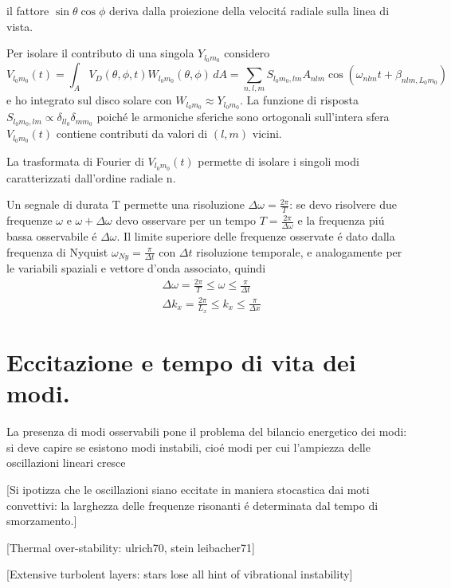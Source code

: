 \documentclass[../main.tex]{subfiles}
\begin{document}
il fattore $\sin{\theta}\cos{\phi}$ deriva dalla proiezione della velocit\'a radiale sulla linea di vista.

Per isolare il contributo di una singola $Y_{l_0m_0}$ considero
\begin{equation}
V_{l_0m_0}(t)=\int_AV_D(\theta,\phi,t)W_{l_0m_0}(\theta,\phi)\,dA=\sum_{n,l,m}S_{l_0m_0,lm}A_{nlm}\cos{(\omega_{nlm}t+\beta_{nlm,L_0m_0})}
\end{equation}
e ho integrato sul disco solare con $W_{l_0m_0}\approx Y_{l_0m_0}$. La funzione di risposta $S_{l_0m_0,lm}\propto\delta_{ll_0}\delta_{mm_0}$ poich\'e le armoniche sferiche sono ortogonali sull'intera sfera $V_{l_0m_0}(t)$ contiene contributi da valori di $(l,m)$ vicini.

La trasformata di Fourier di $V_{l_0m_0}(t)$ permette di isolare i singoli modi caratterizzati dall'ordine radiale n.

Un segnale di durata T permette una risoluzione $\Delta\omega=\frac{2\pi}{T}$: se devo risolvere due frequenze $\omega$ e $\omega+\Delta\omega$ devo osservare per un tempo $T=\frac{2\pi}{\Delta\omega}$ e la frequenza pi\'u bassa osservabile \'e $\Delta\omega$. Il limite superiore delle frequenze osservate \'e dato dalla frequenza di Nyquist $\omega_{Ny}=\frac{\pi}{\Delta t}$ con $\Delta t$ risoluzione temporale, e analogamente per le variabili spaziali e vettore d'onda associato, quindi
\begin{align}
&\Delta\omega=\frac{2\pi}{T}\leq\omega\leq\frac{\pi}{\Delta t}\\
&\Delta k_x=\frac{2\pi}{L_x}\leq k_x\leq\frac{\pi}{\Delta x}
\end{align}


\section{Eccitazione e tempo di vita dei modi.}

La presenza di modi osservabili pone il problema del bilancio energetico dei modi: si deve capire se esistono modi instabili, cio\'e modi per cui l'ampiezza delle oscillazioni lineari cresce


[Si ipotizza che le oscillazioni siano eccitate in maniera stocastica dai moti convettivi: la larghezza delle frequenze risonanti \'e determinata dal tempo di smorzamento.]

[Thermal over-stability: ulrich70, stein leibacher71]

[Extensive turbolent layers: stars lose all hint of vibrational instability]
\end{document}
